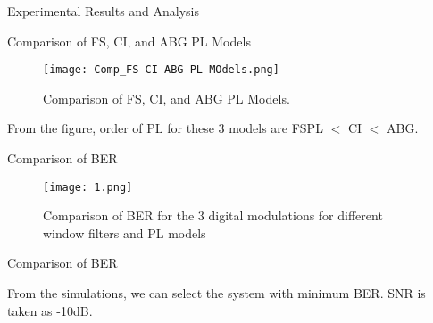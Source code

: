 \documentclass{beamer}
\begin{document}
\begin{frame}{Experimental Results and Analysis}
  \begin{block}{Comparison of FS, CI, and ABG PL Models}
    \begin{figure}
    \centering
    \texttt{[image: Comp\_FS CI ABG PL MOdels.png]}
    \caption{Comparison of FS, CI, and ABG PL Models.}
    \label{fig:my_label3}
    \end{figure}
     From the figure, order of PL for these 3 models are FSPL $<$ CI $<$ ABG.
  \end{block}
\end{frame}

\begin{frame}{Comparison of BER}
   \begin{figure}
    \centering
    \texttt{[image: 1.png]}
    \caption{Comparison of BER for the 3 digital modulations for different window filters and PL models}
    \label{fig:my_label4}
    \end{figure}
\end{frame}

\begin{frame}{Comparison of BER}
 \begin{block}{}
        From the simulations, we can select the system with minimum BER. SNR is taken as -10dB.
 \end{block}
\end{frame}
\end{document}

